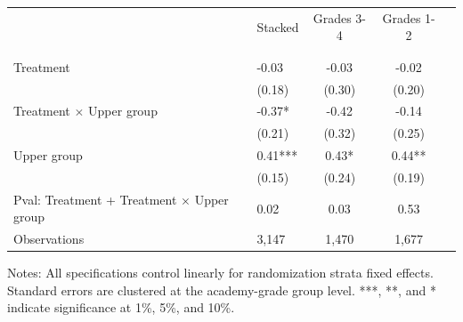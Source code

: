 \begin{center} 
\caption{\small The Effect of treatment by upper or lower group placement} 
\label{tab:descriptives} 
\begin{small}
\begin{threeparttable}
\begin{tabular} {@{} l l c c c   @{}} \toprule \toprule
& Stacked & Grades 3-4 & Grades 1-2 & \\
 \\ \midrule 
\\
 Treatment      &  -0.03  &  -0.03  &  -0.02   \\
             &  (0.18)  &  (0.30)  &  (0.20)   \\
 Treatment $\times$ Upper group      &  -0.37*  &  -0.42  &  -0.14   \\
             &  (0.21)  &  (0.32)  &  (0.25)   \\
 Upper group      &  0.41***  &  0.43*  &  0.44**   \\
             &  (0.15)  &  (0.24)  &  (0.19)   \\
\midrule
Pval: Treatment + Treatment $\times$ Upper group     &  0.02  &  0.03  &  0.53   \\
Observations     & 3,147  & 1,470  & 1,677   \\
\bottomrule
\end{tabular}
\begin{tablenotes}
\item Notes: All specifications control linearly for randomization strata fixed effects. Standard errors are clustered at the academy-grade group level. ***, **, and * indicate significance at 1\%, 5\%, and 10\%. \end{tablenotes}
\end{threeparttable}
\end{small}
\end{center}
\clearpage
